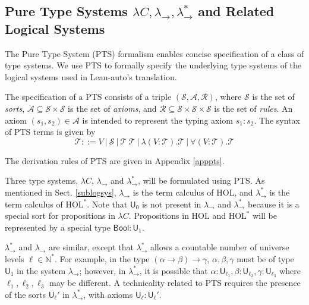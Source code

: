 \subsection{Pure Type Systems $\lambda C, \lambda_\to, \lambda_\to^*$ and Related Logical Systems}\label{sectpts}

  The Pure Type System (PTS) \cite{LambdaWithType} formalism enables concise specification
  of a class of type systems. We use PTS to formally specify the underlying type systems
  of the logical systems used in Lean-auto's translation.

  The specification of a PTS consists of a triple $(\mathcal{S}, \mathcal{A}, \mathcal{R})$,
  where $\mathcal{S}$ is the set of \textit{sorts}, $\mathcal{A} \subseteq \mathcal{S} \times \mathcal{S}$ is
  the set of \textit{axioms}, and $\mathcal{R} \subseteq \mathcal{S} \times \mathcal{S} \times \mathcal{S}$
  is the set of \textit{rules}. An axiom $(s_1, s_2) \in \mathcal{A}$ is intended to represent
  the typing axiom $s_1 : s_2$. The syntax of PTS terms is given by
  $$\mathcal{T} ::= V \ | \ \mathcal{S} \ | \ \mathcal{T} \ \mathcal{T} \ |
    \ \lambda (V : \mathcal{T}). \mathcal{T} \ | \ \forall (V : \mathcal{T}). \mathcal{T}$$
  
  The derivation rules of PTS are given in Appendix \ref{apppts}.

  Three type systems, $\lambda C$, $\lambda_\to$ and $\lambda_\to^*$, will be formulated
  using PTS. As mentioned in Sect. \ref{sublogsys}, $\lambda_\to$
  is the term calculus of HOL, and $\lambda_\to^*$ is the term
  calculus of $\text{HOL}^*$. Note that $\mathsf{U}_0$ is not present in $\lambda_\to$ and $\lambda_\to^*$
  because it is a special sort for propositions in $\lambda C$.
  Propositions in $\text{HOL}$ and $\text{HOL}^*$ will be represented by
  a special type $\mathsf{Bool} : \mathsf{U}_1$.
  
  $\lambda_\to^*$ and $\lambda_\to$ are similar, except that $\lambda_\to^*$ allows a
  countable number of universe levels $\ell \in \mathbb{N}^*$. For example,
  in the type $(\alpha \to \beta) \to \gamma$, $\alpha, \beta, \gamma$ must be of type $\mathsf{U}_1$
  in the system $\lambda_\to$; however, in $\lambda_\to^*$, it is possible that $\alpha : \mathsf{U}_{\ell_1},
  \beta : \mathsf{U}_{\ell_2}, \gamma : \mathsf{U}_{\ell_3}$ where $\ell_1, \ell_2, \ell_3$
  may be different. A technicality related to PTS requires the presence of
  the sorts $\mathsf{U}_\ell'$ in $\lambda_\to^*$, with axioms $\mathsf{U}_\ell : \mathsf{U}_\ell'$.

